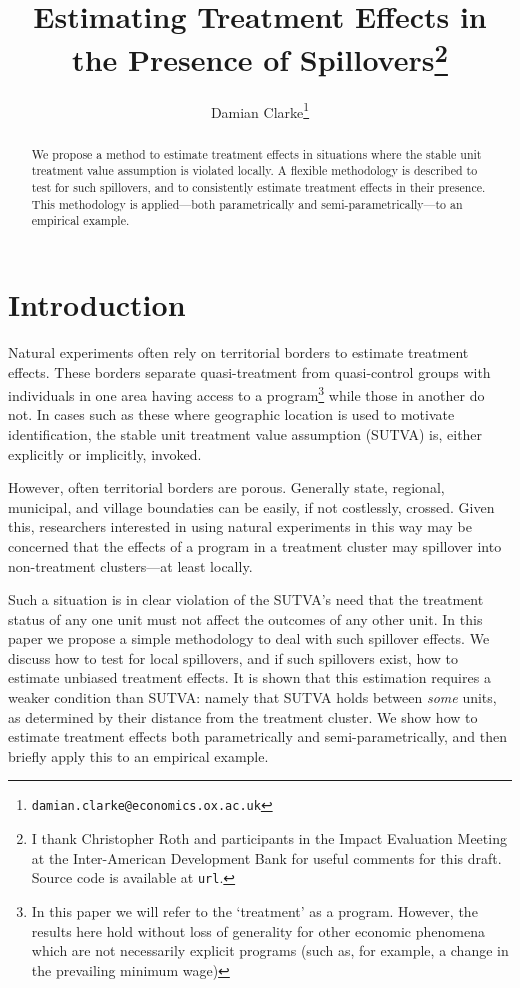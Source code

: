 \documentclass{article}
\title{Estimating Treatment Effects in the Presence of Spillovers\footnote{
I thank Christopher Roth and participants in the Impact Evaluation Meeting
at the Inter-American Development Bank for useful comments for this draft.
Source code is available at \texttt{url}.}}
\author{Damian Clarke\thanks{\texttt{damian.clarke@economics.ox.ac.uk}}}
\begin{document}
\maketitle

\begin{abstract}
We propose a method to estimate treatment effects in situations where the stable
unit treatment value assumption is violated locally.  A flexible methodology is
described to test for such spillovers, and to consistently estimate treatment 
effects in their presence.  This methodology is applied---both parametrically and
semi-parametrically---to an empirical example.
\end{abstract}

\section{Introduction}
Natural experiments often rely on territorial borders to estimate treatment 
effects.  These borders separate quasi-treatment from quasi-control groups with
individuals in one area having access to a program\footnote{In this paper we will
refer to the `treatment' as a program.  However, the results here hold without 
loss of generality for other economic phenomena which are not necessarily 
explicit programs (such as, for example, a change in the prevailing minimum wage)} 
while those in another do not.  In cases such as these where geographic location 
is used to motivate identification, the stable unit treatment value assumption 
(SUTVA) is, either explicitly or implicitly, invoked.

However, often territorial borders are porous.  Generally state, regional,
municipal, and village boundaties can be easily, if not costlessly, crossed.
Given this, researchers interested in using natural experiments in this way may
be concerned that the effects of a program in a treatment cluster may spillover 
into non-treatment clusters---at least locally.

Such a situation is in clear violation of the SUTVA's need that the treatment
status of any one unit must not affect the outcomes of any other unit.  In this 
paper we propose a simple methodology to deal with such spillover effects.  We
discuss how to test for local spillovers, and if such spillovers exist, how to 
estimate unbiased treatment effects.  It is shown that this estimation requires
a weaker condition than SUTVA: namely that SUTVA holds between \emph{some} units, 
as determined by their distance from the treatment cluster.  We show how to 
estimate treatment effects both parametrically and semi-parametrically, and then
briefly apply this to an empirical example.
\end{document}
